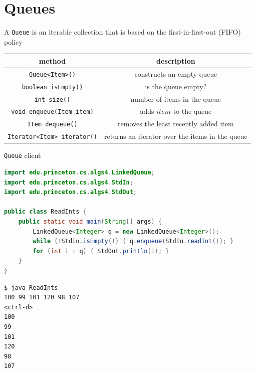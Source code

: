 \documentclass[8pt,a4paper,compress]{beamer}
\begin{document}
\section{Queues}
\begin{frame}[fragile]
\pause

A \lstinline{Queue} is an iterable collection that is based on the first-in-first-out (FIFO) policy
\begin{center}
\begin{tabular}{cc}
method & description \\ \hline
\lstinline$Queue<Item>()$ & constructs an empty queue \\
\lstinline$boolean isEmpty()$ & is the queue empty? \\
\lstinline$int size()$ & number of items in the queue \\
\lstinline$void enqueue(Item item)$ & adds $item$ to the queue \\
\lstinline$Item dequeue()$ & removes the least recently added item \\
\lstinline$Iterator<Item> iterator()$ & returns an iterator over the items in the queue
\end{tabular} 
\end{center}

\pause

\lstinline{Queue} client
\begin{lstlisting}[language=Java]
import edu.princeton.cs.algs4.LinkedQueue;
import edu.princeton.cs.algs4.StdIn;
import edu.princeton.cs.algs4.StdOut;

public class ReadInts {
    public static void main(String[] args) {
        LinkedQueue<Integer> q = new LinkedQueue<Integer>();
        while (!StdIn.isEmpty()) { q.enqueue(StdIn.readInt()); }
        for (int i : q) { StdOut.println(i); }
    }
}
\end{lstlisting}

\pause

\begin{lstlisting}[language={}]
$ java ReadInts
100 99 101 120 98 107
<ctrl-d>
100
99
101
120
98
107
\end{lstlisting}
\end{frame}
\end{document}
